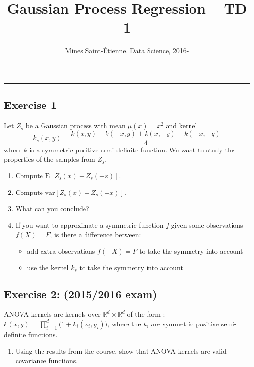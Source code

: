 \documentclass[11pt]{scrartcl}
\title{Gaussian Process Regression -- TD 1}
\author{Mines Saint-\'Etienne, Data Science,  2016\:-\:2017 }
\date{}
\begin{document}
\maketitle
\vspace{-1cm}
\hrule
\vspace{5mm}

\subsection*{Exercise 1}

Let $Z_s$ be a Gaussian process with mean $\mu(x) = x^2$ and kernel
\begin{equation*}
k_s(x,y) = \frac{k(x,y)+k(-x,y)+k(x,-y)+k(-x,-y)}{4}
\end{equation*}
where $k$ is a symmetric positive semi-definite function. We want to study the properties of the samples from $Z_s$.

\begin{enumerate}[resume]
		\item Compute $\mathrm{E}[Z_s(x) - Z_s(-x)]$.
		\item Compute $\mathrm{var}[Z_s(x) - Z_s(-x)]$.
		\item What can you conclude?
		\item If you want to approximate a symmetric function $f$ given some observations $f(X)=F$, is there a difference between:
		\begin{itemize}
			\item add extra observations $f(-X) = F$ to take the symmetry into account
			\item use the kernel $k_s$ to take the symmetry into account
		\end{itemize}
\end{enumerate}

\subsection*{Exercise 2: (2015/2016 exam)}
ANOVA kernels are kernels over $\mathds{R}^d \times \mathds{R}^d$ of the form : $ k(x,y) = \prod_{i=1}^d  \big(1+k_i(x_i,y_i) \big)$, where the $k_i$ are symmetric positive semi-definite functions.

\begin{enumerate}
\item Using the results from the course, show that ANOVA kernels are valid covariance functions.
\end{enumerate} 
\end{document}
